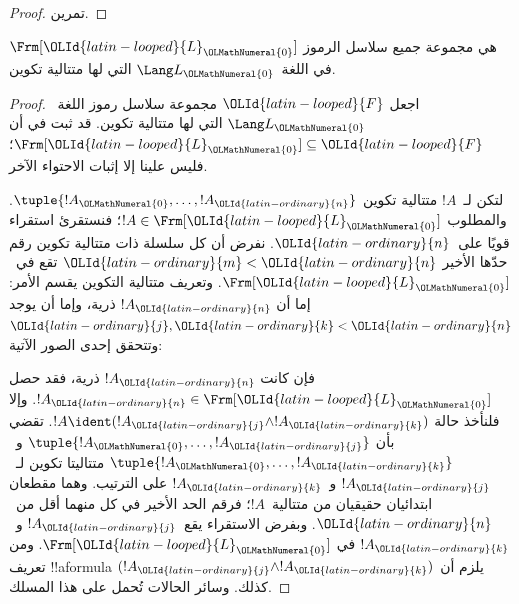 \documentclass[../../../include/open-logic-section]{subfiles}
\begin{document}
\begin{proof}
تمرين.
\end{proof}

\begin{thm}
$\Frm[{\OLId{latin-looped}{L}}_{\OLMathNumeral{0}}]$ هي مجموعة جميع سلاسل الرموز في اللغة~$\Lang L_{\OLMathNumeral{0}}$ التي
لها متتالية تكوين.
\end{thm}

\begin{proof}
اجعل ${\OLId{latin-looped}{F}}$ مجموعة سلاسل رموز اللغة~$\Lang L_{\OLMathNumeral{0}}$ التي لها متتالية تكوين.
قد ثبت في  أن
$\Frm[{\OLId{latin-looped}{L}}_{\OLMathNumeral{0}}] \subseteq {\OLId{latin-looped}{F}}$؛ فليس علينا إلا إثبات الاحتواء الآخر.

لتكن لـ~$!A$ متتالية تكوين $\tuple{!A_{\OLMathNumeral{0}},\dotsc,!A_{\OLId{latin-ordinary}{n}}}$.
والمطلوب $!A \in \Frm[{\OLId{latin-looped}{L}}_{\OLMathNumeral{0}}]$؛ فنستقرئ استقراء قويًا على~${\OLId{latin-ordinary}{n}}$.
نفرض أن كل سلسلة ذات متتالية تكوين رقم حدّها الأخير
${\OLId{latin-ordinary}{m}} < {\OLId{latin-ordinary}{n}}$ تقع في~$\Frm[{\OLId{latin-looped}{L}}_{\OLMathNumeral{0}}]$. وتعريف متتالية التكوين يقسم الأمر: إما أن $!A_{\OLId{latin-ordinary}{n}}$ ذرية، وإما أن يوجد ${\OLId{latin-ordinary}{j}},{\OLId{latin-ordinary}{k}} < {\OLId{latin-ordinary}{n}}$ وتتحقق إحدى الصور الآتية:
\begin{enumerate}
\end{enumerate}
فإن كانت $!A_{\OLId{latin-ordinary}{n}}$ ذرية، فقد حصل
$!A_{\OLId{latin-ordinary}{n}} \in \Frm[{\OLId{latin-looped}{L}}_{\OLMathNumeral{0}}]$. وإلا فلنأخذ حالة $!A \ident
(!A_{\OLId{latin-ordinary}{j}} \land !A_{\OLId{latin-ordinary}{k}})$. تقضي  بأن
$\tuple{!A_{\OLMathNumeral{0}},\dotsc,!A_{\OLId{latin-ordinary}{j}}}$ و~$\tuple{!A_{\OLMathNumeral{0}},\dotsc,!A_{\OLId{latin-ordinary}{k}}}$ متتاليتا تكوين لـ~$!A_{\OLId{latin-ordinary}{j}}$ و~$!A_{\OLId{latin-ordinary}{k}}$ على الترتيب. وهما مقطعان ابتدائيان حقيقيان من متتالية~$!A$؛ فرقم الحد الأخير في كل منهما أقل من~${\OLId{latin-ordinary}{n}}$. وبفرض الاستقراء يقع~$!A_{\OLId{latin-ordinary}{j}}$ و~$!A_{\OLId{latin-ordinary}{k}}$ في
$\Frm[{\OLId{latin-looped}{L}}_{\OLMathNumeral{0}}]$. ومن تعريف !!a{formula} يلزم أن
$(!A_{\OLId{latin-ordinary}{j}} \land !A_{\OLId{latin-ordinary}{k}})$ كذلك. وسائر الحالات تُحمل على هذا المسلك.
\end{proof}
\end{document}
